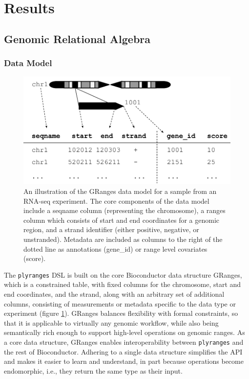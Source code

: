 \documentclass[]{article}
\begin{document}
\section{Results}\label{results}

\subsection{Genomic Relational
Algebra}\label{genomic-relational-algebra}

\subsubsection{Data Model}\label{data-model}

\begin{figure}
\includegraphics[width=\textwidth]{diagrams/GRanges}
\caption{An illustration of the GRanges data model for a
sample from an RNA-seq experiment. The core components of the data model
include a seqname column (representing the chromosome), a ranges column
which consists of start and end coordinates for a genomic region, and a
strand identifier (either positive, negative, or unstranded). Metadata
are included as columns to the right of the dotted line as annotations
(gene\_id) or range level covariates (score).}
\label{fig:GRanges} 
\end{figure}

The \texttt{plyranges} DSL is built on the core Bioconductor data
structure GRanges, which is a constrained table, with fixed columns for
the chromosome, start and end coordinates, and the strand, along with an
arbitrary set of additional columns, consisting of measurements or
metadata specific to the data type or experiment (figure
\ref{fig:GRanges}). GRanges balances flexibility with formal
constraints, so that it is applicable to virtually any genomic workflow,
while also being semantically rich enough to support high-level
operations on genomic ranges. As a core data structure, GRanges enables
interoperability between \texttt{plyranges} and the rest of
Bioconductor. Adhering to a single data structure simplifies the API and
makes it easier to learn and understand, in part because operations
become endomorphic, i.e., they return the same type as their input.
\end{document}
